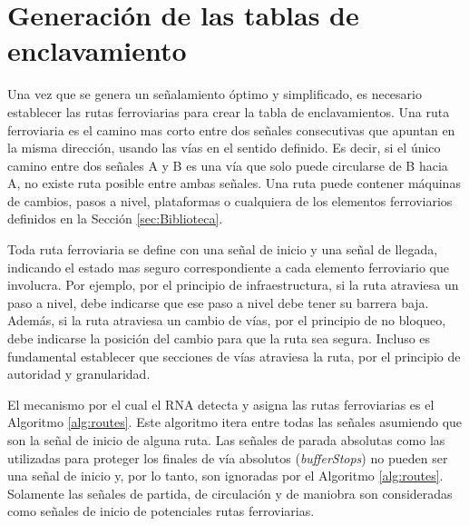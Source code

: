 \section{Generación de las tablas de enclavamiento}
	\label{sec:rutas}
	
	
	Una vez que se genera un señalamiento óptimo y simplificado, es necesario establecer las rutas ferroviarias para crear la tabla de enclavamientos. Una ruta ferroviaria es el camino mas corto entre dos señales consecutivas que apuntan en la misma dirección, usando las vías en el sentido definido. Es decir, si el único camino entre dos señales A y B es una vía que solo puede circularse de B hacia A, no existe ruta posible entre ambas señales. Una ruta puede contener máquinas de cambios, pasos a nivel, plataformas o cualquiera de los elementos ferroviarios definidos en la Sección \ref{sec:Biblioteca}.
	
	Toda ruta ferroviaria se define con una señal de inicio y una señal de llegada, indicando el estado mas seguro correspondiente a cada elemento ferroviario que involucra. Por ejemplo, por el principio de infraestructura, si la ruta atraviesa un paso a nivel, debe indicarse que ese paso a nivel debe tener su barrera baja. Además, si la ruta atraviesa un cambio de vías, por el principio de no bloqueo, debe indicarse la posición del cambio para que la ruta sea segura. Incluso es fundamental establecer que secciones de vías atraviesa la ruta, por el principio de autoridad y granularidad.
	
	El mecanismo por el cual el RNA detecta y asigna las rutas ferroviarias es el Algoritmo \ref{alg:routes}. Este algoritmo itera entre todas las señales asumiendo que son la señal de inicio de alguna ruta. Las señales de parada absolutas como las utilizadas para proteger los finales de vía absolutos (\textit{bufferStops}) no pueden ser una señal de inicio y, por lo tanto, son ignoradas por el Algoritmo \ref{alg:routes}. Solamente las señales de partida, de circulación y de maniobra son consideradas como señales de inicio de potenciales rutas ferroviarias.
	
